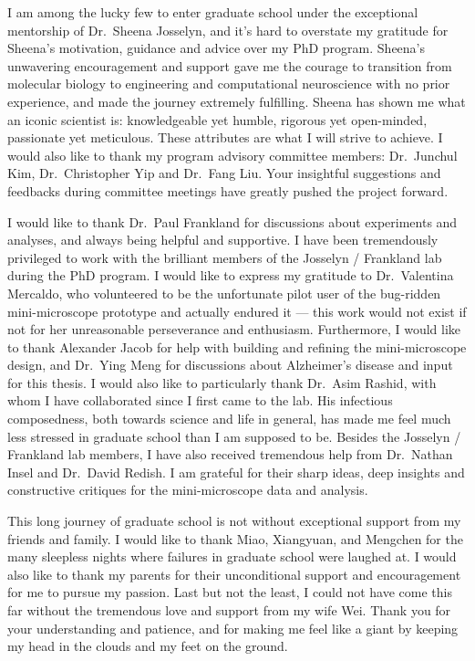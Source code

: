 I am among the lucky few to enter graduate school under the exceptional mentorship of Dr.~Sheena Josselyn, and it's hard to overstate my gratitude for Sheena's motivation, guidance and advice over my PhD program. Sheena's unwavering encouragement and support gave me the courage to transition from molecular biology to engineering and computational neuroscience with no prior experience, and made the journey extremely fulfilling. Sheena has shown me what an iconic scientist is: knowledgeable yet humble, rigorous yet open-minded, passionate yet meticulous. These attributes are what I will strive to achieve. I would also like to thank my program advisory committee members: Dr.~Junchul Kim, Dr.~Christopher Yip and Dr.~Fang Liu. Your insightful suggestions and feedbacks during committee meetings have greatly pushed the project forward. 

I would like to thank Dr.~Paul Frankland for discussions about experiments and analyses, and always being helpful and supportive. I have been tremendously privileged to work with the brilliant members of the Josselyn \slash{} Frankland lab during the PhD program. I would like to express my gratitude to Dr.~Valentina Mercaldo, who volunteered to be the unfortunate pilot user of the bug-ridden mini-microscope prototype and actually endured it --- this work would not exist if not for her unreasonable perseverance and enthusiasm. Furthermore, I would like to thank Alexander Jacob for help with building and refining the mini-microscope design, and Dr.~Ying Meng for discussions about Alzheimer's disease and input for this thesis. I would also like to particularly thank Dr.~Asim Rashid, with whom I have collaborated since I first came to the lab. His infectious composedness, both towards science and life in general, has made me feel much less stressed in graduate school than I am supposed to be. Besides the Josselyn \slash{} Frankland lab members, I have also received tremendous help from Dr.~Nathan Insel and Dr.~David Redish. I am grateful for their sharp ideas, deep insights and constructive critiques for the mini-microscope data and analysis. 

This long journey of graduate school is not without exceptional support from my friends and family.  I would like to thank Miao, Xiangyuan, and Mengchen for the many sleepless nights where failures in graduate school were laughed at. I would also like to thank my parents for their unconditional support and encouragement for me to pursue my passion. Last but not the least, I could not have come this far without the tremendous love and support from my wife Wei. Thank you for your understanding and patience, and for making me feel like a giant by keeping my head in the clouds and my feet on the ground. 

